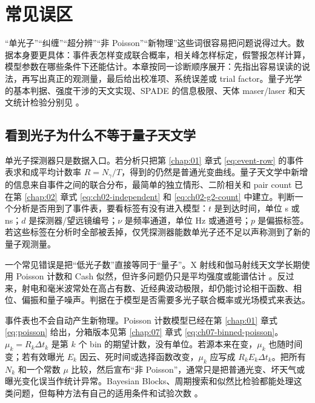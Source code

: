 \chapter{常见误区}
\label{chap:21}

\begin{chapteropening}
“单光子”“纠缠”“超分辨”“非 Poisson”“新物理”这些词很容易把问题说得过大。数据本身要更具体：事件表怎样变成联合概率，相关峰怎样标定，假警报怎样计算，模型参数在哪些条件下还能估计。本章按同一诊断顺序展开：先指出容易误读的说法，再写出真正的观测量，最后给出校准项、系统误差或 trial factor。量子光学的基本判据、强度干涉的天文实现、SPADE 的信息极限、天体 maser/laser 和天文统计检验分别见 \citet{1963PhRv..130.2529G,1963PhRvL..10..277S,1965RvMP...37..231M,1977PhRvL..39..691K,1985stop.book.....G,1995ocqo.book.....M,1956Natur.178.1046H,1957RSPSA.242..300B,1974iiia.book.....H,2020NatAs...4.1164A,2016PhRvX...6c1033T,1992ARA&A..30...75E,1979ApJ...228..939C,2013ApJ...764..167S}。
\end{chapteropening}

\section{看到光子为什么不等于量子天文学}

单光子探测器只是数据入口。若分析只把第 \ref{chap:01} 章式 \eqref{eq:event-row} 的事件表求和成平均计数率 \(R=N_\gamma/T\)，得到的仍然是普通光变曲线。量子天文学中新增的信息来自事件之间的联合分布，最简单的独立情形、二阶相关和 pair count 已在第 \ref{chap:02} 章式 \eqref{eq:ch02-independent} 和 \eqref{eq:ch02-g2-count} 中建立。判断一个分析是否用到了事件表，要看标签有没有进入模型：\(t\) 是到达时间，单位 s 或 ns；\(d\) 是探测器/望远镜编号；\(\nu\) 是频率通道，单位 Hz 或通道号；\(p\) 是偏振标签。若这些标签在分析时全部被丢掉，仅凭探测器能数单光子还不足以声称测到了新的量子观测量。

一个常见错误是把“低光子数”直接等同于“量子”。X 射线和伽马射线天文学长期使用 Poisson 计数和 Cash 似然，但许多问题仍只是平均强度或能谱估计 \citep{1979ApJ...228..939C,1986ApJ...303..336G}。反过来，射电和毫米波常处在高占有数、近经典波动极限，却仍能讨论相干函数、相位、偏振和量子噪声。判据在于模型是否需要多光子联合概率或光场模式来表达。

事件表也不会自动产生新物理。Poisson 计数模型已经在第 \ref{chap:01} 章式 \eqref{eq:poisson} 给出，分箱版本见第 \ref{chap:07} 章式 \eqref{eq:ch07-binned-poisson}。\(\mu_k=R_k\Delta t_k\) 是第 \(k\) 个 bin 的期望计数，没有单位。若源本来在变，\(\mu_k\) 也随时间变；若有效曝光 \(E_k\) 因云、死时间或选择函数改变，\(\mu_k\) 应写成 \(R_kE_k\Delta t_k\)。把所有 \(N_k\) 和一个常数 \(\mu\) 比较，然后宣布“非 Poisson”，通常只是把普通光变、坏天气或曝光变化误当作统计异常。Bayesian Blocks、周期搜索和似然比检验都能处理这类问题，但每种方法有自己的适用条件和试验次数 \citep{1982ApJ...263..835S,1992ApJ...398..146G,2002ApJ...571..545P,2013ApJ...764..167S}。

